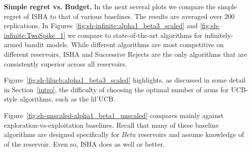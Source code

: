 
\textbf{Simple regret vs. Budget.} 
In the next several plots we compare the simple regret of
ISHA to that of various baselines. The results are averaged over 200 replications.
In Figures~\ref{fig:sh-infinite:alpha1_beta3_scaled}
and \ref{fig:sh-infinite:TwoSpike_1}
we compare to state-of-the-art algorithms for infinitely-armed bandit models. 
While different algorithms are most competitive on different reservoirs, ISHA and Successive Rejects are the only algorithms that are consistently superior across all reservoirs.

 
Figure~\ref{fig:sh-lilucb:alpha1_beta3_scaled} highlights, as discussed in some detail in Section~\ref{intro}, the difficulty of
choosing the optimal number of arms for UCB-style algorithms,
such as the lil'UCB.

Figure~\ref{fig:sh-unscaled-alpha1_beta1_unscaled} compares mainly against exploration-vs-exploitation baselines.
Recall that many of these baseline algorithms are designed specifically for $Beta$ reservoirs and assume knowledge of
of the reservoir. Even so, ISHA does as well or better. 



